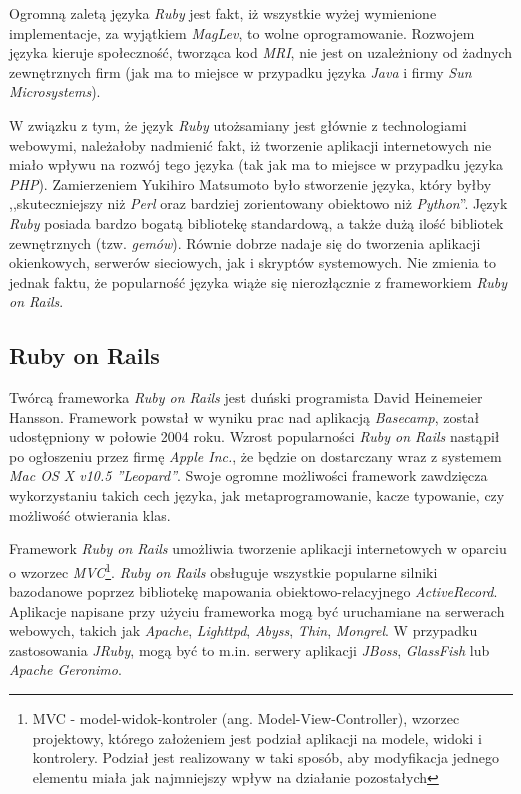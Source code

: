 \documentclass[a4paper,12pt]{article}
\begin{document}
Ogromną zaletą języka \emph{Ruby} jest fakt, iż wszystkie wyżej
wymienione implementacje, za wyjątkiem \emph{MagLev}, to wolne
oprogramowanie. Rozwojem języka kieruje społeczność, tworząca kod
\emph{MRI}, nie jest on uzależniony od żadnych zewnętrznych firm (jak
ma to miejsce w przypadku języka \emph{Java} i firmy \emph{Sun
  Microsystems}).

W związku z tym, że język \emph{Ruby} utożsamiany jest głównie z
technologiami webowymi, należałoby nadmienić fakt, iż tworzenie
aplikacji internetowych nie miało wpływu na rozwój tego języka (tak
jak ma to miejsce w przypadku języka \emph{PHP}). Zamierzeniem
Yukihiro Matsumoto było stworzenie języka, który byłby
,,skuteczniejszy niż \emph{Perl} oraz bardziej zorientowany obiektowo
niż \emph{Python}''\cite{matzinterview}. Język \emph{Ruby} posiada
bardzo bogatą bibliotekę standardową, a także dużą ilość bibliotek
zewnętrznych (tzw. \emph{gemów}). Równie dobrze nadaje się do
tworzenia aplikacji okienkowych, serwerów sieciowych, jak i skryptów
systemowych. Nie zmienia to jednak faktu, że popularność języka wiąże
się nierozłącznie z frameworkiem \emph{Ruby on Rails}.

\subsection{Ruby on Rails}
Twórcą frameworka \emph{Ruby on Rails} jest duński programista David
Heinemeier Hansson. Framework powstał w wyniku prac nad aplikacją
\emph{Basecamp}, został udostępniony w połowie 2004 roku. Wzrost
popularności \emph{Ruby on Rails} nastąpił po ogłoszeniu przez firmę
\emph{Apple Inc.}, że będzie on dostarczany wraz z systemem \emph{Mac
  OS X v10.5 ''Leopard''}\cite{rubyonrails}. Swoje ogromne możliwości
framework zawdzięcza wykorzystaniu takich cech języka, jak
metaprogramowanie, kacze typowanie, czy możliwość otwierania klas.

Framework \emph{Ruby on Rails} umożliwia tworzenie aplikacji
internetowych w oparciu o wzorzec \emph{MVC}\footnote{MVC -
  model-widok-kontroler (ang. Model-View-Controller), wzorzec
  projektowy, którego założeniem jest podział aplikacji na modele,
  widoki i kontrolery. Podział jest realizowany w taki sposób, aby
  modyfikacja jednego elementu miała jak najmniejszy wpływ na
  działanie pozostałych}. \emph{Ruby on Rails} obsługuje wszystkie
popularne silniki bazodanowe poprzez bibliotekę mapowania
obiektowo-relacyjnego \emph{ActiveRecord}. Aplikacje napisane przy
użyciu frameworka mogą być uruchamiane na serwerach webowych, takich
jak \emph{Apache}, \emph{Lighttpd}, \emph{Abyss}, \emph{Thin},
\emph{Mongrel}. W przypadku zastosowania \emph{JRuby}, mogą być to
m.in. serwery aplikacji \emph{JBoss}, \emph{GlassFish} lub
\emph{Apache Geronimo}.
\end{document}
